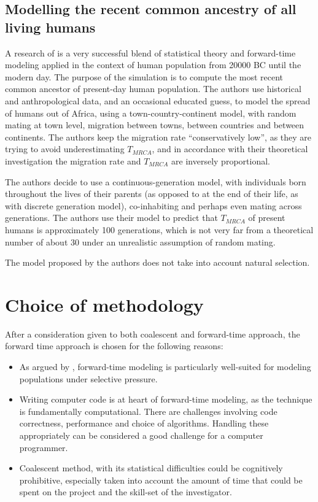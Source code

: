 \documentclass{l4proj}
\begin{document}
\section{Modelling the recent common ancestry of all living humans}

A research of \cite{rohde04} is a very successful blend of statistical theory and forward-time modeling applied in the context of human population from 20000 BC until the modern day. The purpose of the simulation is to compute the most recent common ancestor of present-day human population. The authors use historical and anthropological data, and an occasional educated guess, to model the spread of humans out of Africa, using a town-country-continent model, with random mating at town level, migration between towns, between countries and between continents. The authors keep the migration rate ``conservatively low'', as they are trying to avoid underestimating $T_{MRCA}$, and in accordance with their theoretical investigation the migration rate and $T_{MRCA}$ are inversely proportional.

The authors decide to use a continuous-generation model, with individuals born throughout the lives of their parents (as opposed to at the end of their life, as with discrete generation model), co-inhabiting and perhaps even mating across generations. The authors use their model to predict that $T_{MRCA}$ of present humans is approximately 100 generations, which is not very far from a theoretical number of about 30 under an unrealistic assumption of random mating.

The model proposed by the authors does not take into account natural selection.


\chapter{Choice of methodology}\label{methodology}

After a consideration given to both coalescent and forward-time approach, the forward time approach is chosen for the following reasons:

\begin{itemize}
\item As argued by \cite{peng10}, forward-time modeling is particularly well-suited for modeling populations under selective pressure.
\item Writing computer code is at heart of forward-time modeling, as the technique is fundamentally computational. There are challenges involving code correctness, performance and choice of algorithms. Handling these appropriately can be considered a good challenge for a computer programmer.  
\item Coalescent method, with its statistical difficulties could be cognitively prohibitive, especially taken into account the amount of time that could be spent on the project and the skill-set of the investigator.  
\end{itemize}
\end{document}
